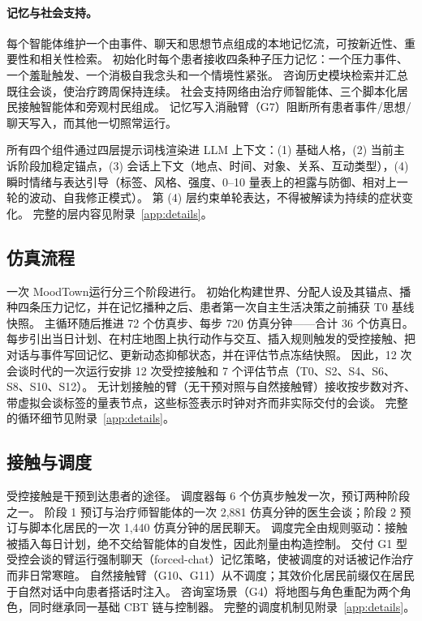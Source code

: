 \documentclass[11pt,a4paper]{article}
\newcommand{\sys}{MoodTown}
\begin{document}
\paragraph{记忆与社会支持。}
每个智能体维护一个由事件、聊天和思想节点组成的本地记忆流，可按新近性、重要性和相关性检索。
初始化时每个患者接收四条种子压力记忆：一个压力事件、一个羞耻触发、一个消极自我念头和一个情境性紧张。
咨询历史模块检索并汇总既往会谈，使治疗跨周保持连续。
社会支持网络由治疗师智能体、三个脚本化居民接触智能体和旁观村民组成。
记忆写入消融臂（G7）阻断所有患者事件/思想/聊天写入，而其他一切照常运行。

所有四个组件通过四层提示词栈渲染进 LLM 上下文：(1) 基础人格，(2) 当前主诉阶段加稳定锚点，(3) 会话上下文（地点、时间、对象、关系、互动类型），(4) 瞬时情绪与表达引导（标签、风格、强度、0--10 量表上的袒露与防御、相对上一轮的波动、自我修正模式）。
第 (4) 层约束单轮表达，不得被解读为持续的症状变化。
完整的层内容见附录~\ref{app:details}。

\subsection{仿真流程}\label{sec:procedure}

一次 \sys 运行分三个阶段进行。
初始化构建世界、分配人设及其锚点、播种四条压力记忆，并在记忆播种之后、患者第一次自主生活决策之前捕获 T0 基线快照。
主循环随后推进 72 个仿真步、每步 720 仿真分钟——合计 36 个仿真日。
每步引出当日计划、在村庄地图上执行动作与交互、插入规则触发的受控接触、把对话与事件写回记忆、更新动态抑郁状态，并在评估节点冻结快照。
因此，12 次会谈时代的一次运行安排 12 次受控接触和 7 个评估节点（T0、S2、S4、S6、S8、S10、S12）。
无计划接触的臂（无干预对照与自然接触臂）接收按步数对齐、带虚拟会谈标签的量表节点，这些标签表示时钟对齐而非实际交付的会谈。
完整的循环细节见附录~\ref{app:details}。

\subsection{接触与调度}\label{sec:contact}

受控接触是干预到达患者的途径。
调度器每 6 个仿真步触发一次，预订两种阶段之一。
阶段 1 预订与治疗师智能体的一次 2{,}881 仿真分钟的医生会谈；阶段 2 预订与脚本化居民的一次 1{,}440 仿真分钟的居民聊天。
调度完全由规则驱动：接触被插入每日计划，绝不交给智能体的自发性，因此剂量由构造控制。
交付 G1 型受控会谈的臂运行强制聊天（forced-chat）记忆策略，使被调度的对话被记作治疗而非日常寒暄。
自然接触臂（G10、G11）从不调度；其效价化居民前缀仅在居民于自然对话中向患者搭话时注入。
咨询室场景（G4）将地图与角色重配为两个角色，同时继承同一基础 CBT 链与控制器。
完整的调度机制见附录~\ref{app:details}。
\end{document}
